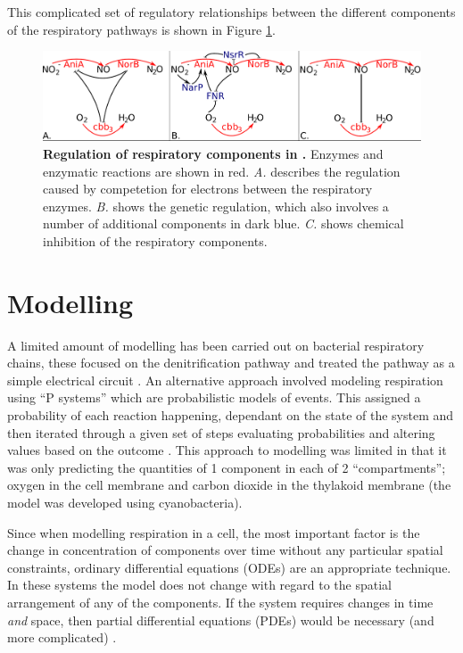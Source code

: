 This complicated set of regulatory relationships between the different components of the respiratory pathways is shown in Figure \ref{fig:respiratory-pathway}.

\begin{figure}
 \begin{center}
 \includegraphics[width=14cm]{./01-introduction/data/regulation.pdf}
\end{center}
\caption{\footnotesize {\bf Regulation of respiratory components in \Nsm.} Enzymes and enzymatic reactions are shown in red. \textit{A.} describes the regulation caused by competetion for electrons between the respiratory enzymes. \textit{B.} shows the genetic regulation, which also involves a number of additional components in dark blue. \textit{C.} shows chemical inhibition of the respiratory components.
\label{fig:respiratory-pathway}}
\end{figure}

\section{Modelling}

A limited amount of modelling has been carried out on bacterial respiratory chains, these focused on the denitrification pathway and treated the pathway as a simple electrical circuit \cite{almeida_unifying_1997}. An alternative approach involved modeling respiration using ``P systems'' which are probabilistic models of events. This assigned a probability of each reaction happening, dependant on the state of the system and then iterated through a given set of steps evaluating probabilities and altering values based on the outcome \cite{cavaliere_modeling_2006}. This approach to modelling was limited in that it was only predicting the quantities of 1 component in each of 2 ``compartments''; oxygen in the cell membrane and carbon dioxide in the thylakoid membrane (the model was developed using cyanobacteria).

Since when modelling respiration in a cell, the most important factor is the change in concentration of components over time without any particular spatial constraints, ordinary differential equations (ODEs) are an appropriate technique. In these systems the model does not change with regard to the spatial arrangement of any of the components. If the system requires changes in time \textit{and} space, then partial differential equations (PDEs) would be necessary (and more complicated) \cite{Klipp2005}.

